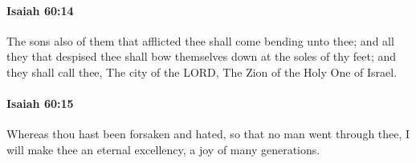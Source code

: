 		\paragraph{Isaiah 60:14} %
			\label{ISAIAH-60-14}

			The sons also of them that afflicted thee shall come bending unto thee; and all they that despised thee shall bow themselves down at the soles of thy feet; and they shall call thee, The city of the LORD, The Zion of the Holy One of Israel.


		\paragraph{Isaiah 60:15} %
			\label{ISAIAH-60-15}

			Whereas thou hast been forsaken and hated, so that no man went through thee, I will make thee an eternal excellency, a joy of many generations.

